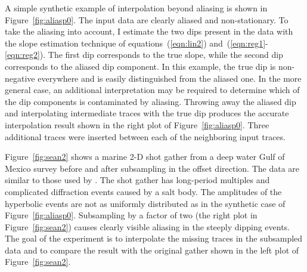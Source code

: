 A simple synthetic example of interpolation beyond aliasing is shown
in Figure~\ref{fig:aliasp0}. The input data are clearly aliased and
non-stationary. To take the aliasing into account, I estimate the two
dips present in the data with the slope estimation technique of
equations~(\ref{eqn:lin2}) and~(\ref{eqn:reg1}-\ref{eqn:reg2}). The
first dip corresponds to the true slope, while the second dip
corresponds to the aliased dip component. In this example, the true
dip is non-negative everywhere and is easily distinguished from the
aliased one. In the more general case, an additional interpretation
may be required to determine which of the dip components is
contaminated by aliasing.  Throwing away the aliased dip and
interpolating intermediate traces with the true dip produces the
accurate interpolation result shown in the right plot of
Figure~\ref{fig:aliasp0}. Three additional traces were inserted between
each of the neighboring input traces.



\par
Figure~\ref{fig:sean2} shows a marine 2-D shot gather from a deep
water Gulf of Mexico survey before and after subsampling in the offset
direction. The data are similar to those used by
\cite{Crawley.sepphd.104}. The shot gather has long-period
multiples and complicated diffraction events caused by a salt body.
The amplitudes of the hyperbolic events are not as uniformly
distributed as in the synthetic case of Figure~\ref{fig:aliasp0}.
Subsampling by a factor of two (the right plot in
Figure~\ref{fig:sean2}) causes clearly visible aliasing in the
steeply dipping events.  The goal of the experiment is to interpolate
the missing traces in the subsampled data and to compare the result
with the original gather shown in the left plot of
Figure~\ref{fig:sean2}.

